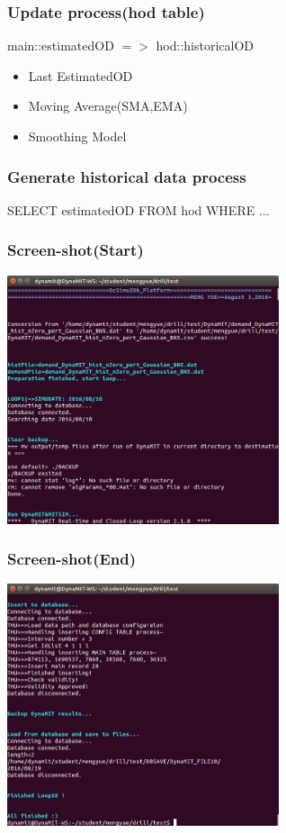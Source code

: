 \documentclass[12pt]{beamer}
\begin{document}
\begin{frame}
\frametitle{Update process(hod table)}
main::estimatedOD $=>$ hod::historicalOD
\begin{itemize}
\item Last EstimatedOD
\item Moving Average(SMA,EMA)
\item Smoothing Model
\end{itemize}
\end{frame}

\begin{frame}
\frametitle{Generate historical data process}
SELECT estimatedOD FROM hod WHERE ...  
\end{frame}

\begin{frame}
\frametitle{Screen-shot(Start)}
\includegraphics[width = 0.6\textwidth]{screenshot_2.png}
\end{frame}

\begin{frame}
\frametitle{Screen-shot(End)}
\includegraphics[width = 0.6\textwidth]{screenshot_1.png}
\end{frame}
\end{document}
